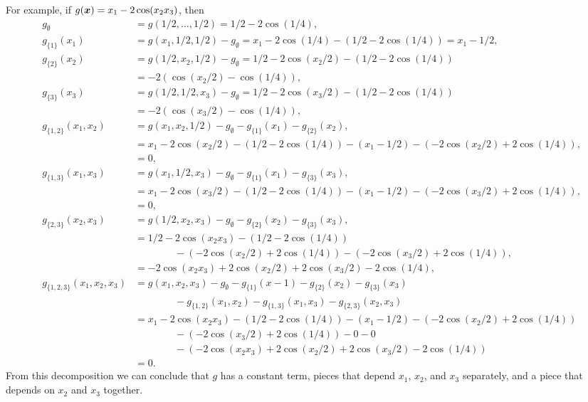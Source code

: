 \documentclass[letterpaper]{amsart}
\begin{document}
For example, if $g(\boldsymbol{x}) = x_1 -2 \cos(x_2 x_3)$, then
\begin{align*}
	g_\emptyset &= g(1/2, \ldots, 1/2) = 1/2 - 2 \cos(1/4), \\
	g_{\{1\}}(x_1) &= g(x_1,1/2,1/2) - g_{\emptyset} = x_1 - 2 \cos(1/4) - ( 1/2 - 2 \cos(1/4)) = x_1 - 1/2,\\
	g_{\{2\}}(x_2) &= g(1/2,x_2,1/2) - g_\emptyset = 1/2 - 2 \cos(x_2/2) - (1/2 - 2 \cos(1/4)) \\
	& = -2(\cos(x_2/2)  - \cos(1/4)),\\
	g_{\{3\}}(x_3) &= g(1/2,1/2, x_3) - g_\emptyset = 1/2 - 2 \cos(x_3/2) - (1/2 - 2 \cos(1/4)) \\
	&= -2  (\cos(x_3/2) - \cos(1/4)),\\
	g_{\{1,2\}}(x_1,x_2) &= g(x_1,x_2,1/2) - g_\emptyset -g_{\{1\}}(x_1) -g_{\{2\}}(x_2), \\
	& = x_1 - 2 \cos(x_2/2) - (1/2 - 2 \cos(1/4)) - (x_1 - 1/2) - (-2\cos(x_2/2) +2 \cos(1/4)),\\
	& = 0,\\
	g_{\{1,3\}}(x_1,x_3) &= g(x_1,1/2,x_3) - g_\emptyset -g_{\{1\}}(x_1) -g_{\{3\}}(x_3), \\
	& = x_1 - 2 \cos(x_3/2) - (1/2 - 2 \cos(1/4)) - (x_1 - 1/2) - (-2\cos(x_3/2) +2 \cos(1/4)),\\
	& = 0, \\
	g_{\{2,3\}}(x_2,x_3) &= g(1/2,x_2,x_3) - g_\emptyset -g_{\{2\}}(x_2) -g_{\{3\}}(x_3), \\
	& = 1/2- 2 \cos(x_2x_3) - (1/2 - 2 \cos(1/4)) \\
	& \qquad \qquad - (-2\cos(x_2/2) +2 \cos(1/4)) - (-2\cos(x_3/2) +2 \cos(1/4)),\\
	& = -2\cos(x_2x_3) + 2 \cos(x_2/2) + 2 \cos(x_3/2) -2\cos(1/4), \\
	g_{\{1,2,3\}}(x_1,x_2,x_3) &= g(x_1,x_2,x_3) -
	g_\emptyset - g_{\{1\}}(x-1) - g_{\{2\}}(x_2) -g_{\{3\}}(x_3) \\
	& \qquad \qquad - g_{\{1,2\}}(x_1,x_2) - g_{\{1,3\}}(x_1,x_3) - g_{\{2,3\}}(x_2,x_3) \\
	& = x_1 -2 \cos(x_2 x_3) - (1/2 - 2 \cos(1/4)) - (x_1 - 1/2) - (-2\cos(x_2/2) +2 \cos(1/4)) \\
	& \qquad \qquad - (-2\cos(x_3/2) +2 \cos(1/4)) - 0 - 0 \\
	& \qquad \qquad - ( -2\cos(x_2x_3) + 2 \cos(x_2/2) + 2 \cos(x_3/2) -2\cos(1/4)) \\
	& = 0.
\end{align*}
From this decomposition we can conclude that $g$ has a constant term, pieces that depend $x_1$, $x_2$, and $x_3$ separately, and a piece that depends on $x_2$ and $x_3$ together.
\end{document}
